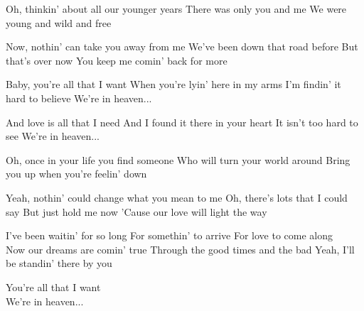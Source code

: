 \begin{verse*}
Oh, thinkin' about all our younger years
There was only you and me
We were young and wild and free
\end{verse*}

\begin{verse*}
Now, nothin' can take you away from me
We've been down that road before
But that's over now
You keep me comin' back for more
\end{verse*}

\begin{chorus}
Baby, you're all that I want
When you're lyin' here in my arms
I'm findin' it hard to believe
We're in heaven...
\end{chorus}

\begin{verse*}
And love is all that I need
And I found it there in your heart
It isn't too hard to see
We're in heaven...
\end{verse*}

\begin{verse*}
Oh, once in your life you find someone
Who will turn your world around
Bring you up when you're feelin' down
\end{verse*}

\begin{verse*}
Yeah, nothin' could change what you mean to me
Oh, there's lots that I could say
But just hold me now
'Cause our love will light the way
\end{verse*}

\thechorus

\begin{bridge*}
I've been waitin' for so long
For somethin' to arrive
For love to come along\\
Now our dreams are comin' true
Through the good times and the bad
Yeah, I'll be standin' there by you
\end{bridge*}

\thechorus

\begin{verse*}
You're all that I want\\
We're in heaven...
\end{verse*}